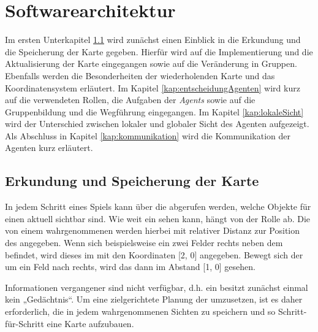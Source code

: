 \section{Softwarearchitektur}

Im ersten Unterkapitel \ref{erkundungDerKarte} wird zunächst einen Einblick in die Erkundung und die Speicherung der Karte gegeben. Hierfür wird auf die Implementierung und die Aktualisierung der Karte eingegangen sowie auf die Veränderung in Gruppen. Ebenfalls werden die Besonderheiten der wiederholenden Karte und das Koordinatensystem erläutert. Im Kapitel \ref{kap:entscheidungAgenten} wird kurz auf die verwendeten Rollen, die Aufgaben der \textit{Agents} sowie auf die Gruppenbildung und die Wegführung eingegangen. Im Kapitel \ref{kap:lokaleSicht} wird der Unterschied zwischen lokaler und globaler Sicht des Agenten aufgezeigt. Als Abschluss in Kapitel \ref{kap:kommunikation} wird die Kommunikation der Agenten kurz erläutert.

\subsection{Erkundung und Speicherung der Karte} \label{erkundungDerKarte}



In jedem Schritt eines Spiels kann über die \Percepts abgerufen werden, welche Objekte für einen \Agent aktuell sichtbar sind. Wie weit ein \Agent sehen kann, hängt von der Rolle ab. Die von einem \Agent wahrgenommenen \Things werden hierbei mit relativer Distanz zur Position des \Agents angegeben. Wenn sich beispielsweise ein \Obstacle zwei Felder rechts neben dem \Agent befindet, wird dieses im \Percept mit den Koordinaten [2, 0] angegeben. Bewegt sich der \Agent um ein Feld nach rechts, wird das \Obstacle dann im Abstand [1, 0] gesehen. 

Informationen vergangener \Percepts sind nicht verfügbar, d.h. ein \Agent besitzt zunächst einmal kein „Gedächtnis“. Um eine zielgerichtete Planung der \Agents umzusetzen, ist es daher erforderlich, die in jedem \Step wahrgenommenen Sichten zu speichern und so Schritt-für-Schritt eine Karte aufzubauen. \\

